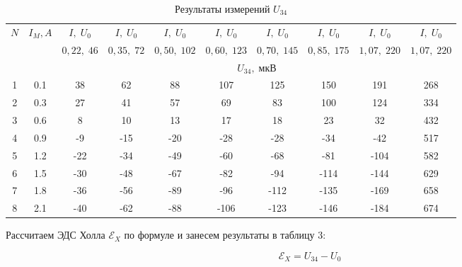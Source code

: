 \documentclass[12pt]{kiarticle} %
\newcommand{\eds}{\ensuremath{ \mathscr{E}}}
\begin{document}
\begin{enumerate}
  \begin{table}[h!]
  	\centering
  	\caption{Результаты измерений $ U_{34} $}
  	\begin{tabularx}{\textwidth}{|c|c|c|c|c|c|c|c|c|c|}
  		\hline
  		\multirow{3}{*}{$ N $} & \multirow{3}{*}{$ I_M, A $} & 
  		$I, \; U_0 $ &
  			$I, \;U_0 $ &
  			$I, \;U_0 $ &
  		$I, \;U_0 $ &
  		$I, \;U_0 $ & 
  		$I, \;U_0 $ &
  		$I, \;U_0 $ &
  			$I, \;U_0 $ 
  		\\
  		& &
  		 $0,22,  \;46$ &
  		$ 0,35,  \;72 $ &
  		   $  0,50, \;102$ &
  		     $  0,60,  \;123$ &
  		     $ 0,70,  \;145$ & 
  		      $ 0,85, \; 175$ &
  		      $  1,07,  \;220 $  &
  		      $ 1,07,\; 220 $
  		       \\
  		       \cline{3-10}
  		       & & \multicolumn{8}{|c|}{$ U_{34}, \; мкВ $} \\
  		       \hline
  		 1& 0.1& 38 & 62 & 88 & 107 & 125 & 150 & 191 & 268 \\
  		2 & 0.3 & 27 & 41 & 57 & 69 & 83 & 100 & 124 & 334 \\
  		3 & 0.6 & 8 & 10 & 13 & 17 & 18 & 23 & 32 & 432 \\
  		4 & 0.9 & -9 & -15 & -20 & -28 & -28 & -34 & -42 & 517 \\
  		5 & 1.2 & -22 & -34 & -49 & -60 & -68 & -81 & -104 & 582 \\
  		6 & 1.5 & -30 & -48 & -67 & -82 & -94 & -114 & -144 & 629 \\
  		7 & 1.8 & -36 & -56 & -89 & -96 & -112 & -135 & -169 & 658 \\
  		8 & 2.1 & -40 & -62 & -88 & -106 & -123 & -146 & -184 & 674 \\
  		\hline
  	\end{tabularx}
  	\label{resU}%
  \end{table}%
  
  Рассчитаем ЭДС Холла $ \eds_X $ по формуле и занесем результаты в таблицу 3:
  
  \begin{equation}\label{}
  \eds_X = U_{34} - U_0
  \end{equation}
  

\end{enumerate}
\end{document}

